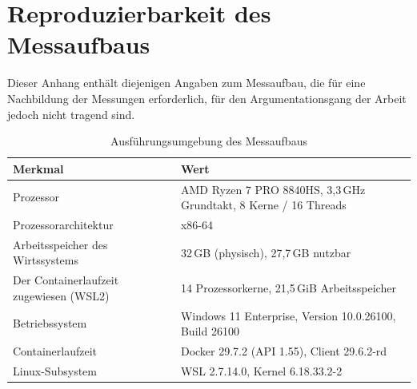 \Appendix
\label{ch:Appendix}

\section{Reproduzierbarkeit des Messaufbaus}
\label{sec:app-reproduzierbarkeit}

Dieser Anhang enthält diejenigen Angaben zum Messaufbau, die für eine Nachbildung der Messungen erforderlich, für den Argumentationsgang der Arbeit jedoch nicht tragend sind.

\begin{table}[htbp]
\renewcommand{\arraystretch}{1.3}
\footnotesize
  \centering
  \caption{Ausführungsumgebung des Messaufbaus}
  \label{tab:impl-umgebung}
  \begin{tabular}{p{} p{}}
    \toprule
    \textbf{Merkmal} & \textbf{Wert} \\
    \midrule
    Prozessor & AMD Ryzen 7 PRO 8840HS, 3,3\,GHz Grundtakt, 8 Kerne / 16 Threads \\
    Prozessorarchitektur & x86-64 \\
    Arbeitsspeicher des Wirtssystems & 32\,GB (physisch), 27,7\,GB nutzbar \\
    Der Containerlaufzeit zugewiesen (WSL2) & 14 Prozessorkerne, 21,5\,GiB Arbeitsspeicher \\
    Betriebssystem & Windows 11 Enterprise, Version 10.0.26100, Build 26100 \\
    Containerlaufzeit & Docker 29.7.2 (API 1.55), Client 29.6.2-rd \\
    Linux-Subsystem & WSL 2.7.14.0, Kernel 6.18.33.2-2 \\
    \bottomrule
  \end{tabular}
\end{table}
\normalsize


